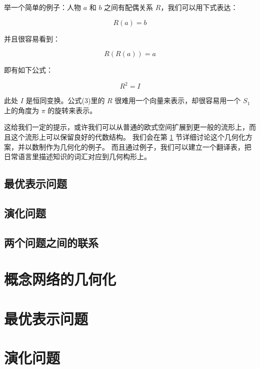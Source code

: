 \documentclass[a4paper,12pt]{article}
\begin{document}
举一个简单的例子：人物 $a$ 和 $b$ 之间有配偶关系 $R$，我们可以用下式表达：

\begin{equation}
R(a) = b
\end{equation}

并且很容易看到：

\begin{equation}
R(R(a)) = a
\end{equation}

即有如下公式：　

\begin{equation}
R^2 = I
\end{equation}

此处 $I$ 是恒同变换。公式(3)里的 $R$ 很难用一个向量来表示，却很容易用一个 $S_1$ 上的角度为 $\pi$ 的旋转来表示。

这给我们一定的提示，或许我们可以从普通的欧式空间扩展到更一般的流形上，而且这个流形上可以保留良好的代数结构。
我们会在第 \ref{sec:geometry} 节详细讨论这个几何化方案，并以数制作为几何化的例子。
而且通过例子，我们可以建立一个翻译表，把日常语言里描述知识的词汇对应到几何构形上。

\subsection{最优表示问题}

\subsection{演化问题}

\subsection{两个问题之间的联系}

\newpage

\section{概念网络的几何化}
\label{sec:geometry}

\newpage

\section{最优表示问题}

\newpage

\section{演化问题}
\end{document}
